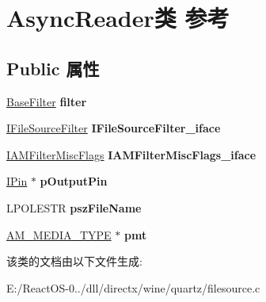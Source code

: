 \hypertarget{struct_async_reader}{}\section{Async\+Reader类 参考}
\label{struct_async_reader}
\subsection*{Public 属性}
\begin{DoxyCompactItemize}
\item 
\mbox{\label{struct_async_reader_a35f2de3bcf9a048c936b394db418222f}} 
\hyperlink{struct_base_filter}{Base\+Filter} {\bfseries filter}
\item 
\mbox{\label{struct_async_reader_a9303052a5dc563561ee68da80eda363e}} 
\hyperlink{interface_i_file_source_filter}{I\+File\+Source\+Filter} {\bfseries I\+File\+Source\+Filter\+\_\+iface}
\item 
\mbox{\label{struct_async_reader_ae6705a4d80e64c48288a7ea8dd31a0d3}} 
\hyperlink{interface_i_a_m_filter_misc_flags}{I\+A\+M\+Filter\+Misc\+Flags} {\bfseries I\+A\+M\+Filter\+Misc\+Flags\+\_\+iface}
\item 
\mbox{\label{struct_async_reader_a057f0c9da39024a3cf4013570da916d3}} 
\hyperlink{interface_i_pin}{I\+Pin} $\ast$ {\bfseries p\+Output\+Pin}
\item 
\mbox{\label{struct_async_reader_a8a1bb53c717fcb671b3827357dd9ed64}} 
L\+P\+O\+L\+E\+S\+TR {\bfseries psz\+File\+Name}
\item 
\mbox{\label{struct_async_reader_a9bcbf9af9e21415ead03dd0b02c29b2c}} 
\hyperlink{struct_a_m___m_e_d_i_a___t_y_p_e}{A\+M\+\_\+\+M\+E\+D\+I\+A\+\_\+\+T\+Y\+PE} $\ast$ {\bfseries pmt}
\end{DoxyCompactItemize}


该类的文档由以下文件生成\+:\begin{DoxyCompactItemize}
\item 
E\+:/\+React\+O\+S-\/0../dll/directx/wine/quartz/filesource.\+c\end{DoxyCompactItemize}
